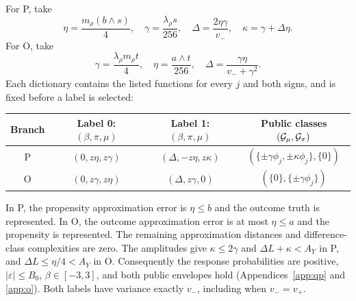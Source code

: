 \documentclass{article}
\theoremstyle{definition}
\theoremstyle{remark}
\begin{document}
For P, take
\[
 \eta=\frac{m_\rho(b\wedge s)}4,\quad
 \gamma=\frac{\lambda_\rho s}{256},\quad
 \Delta=\frac{2\eta\gamma}{v_-},\quad \kappa=\gamma+\Delta\eta.
\]
For O, take
\[
 \gamma=\frac{\lambda_\rho m_\rho t}4,\quad
 \eta=\frac{a\wedge t}{256},\quad
 \Delta=\frac{\gamma\eta}{v_-+\gamma^2}.
\]
Each dictionary contains the listed functions for every \(j\) and both signs, and is fixed before a label is selected:
\begin{center}
\begin{tabular}{c c c c}
\toprule
Branch & Label 0: \((\beta,\pi,\mu)\) & Label 1: \((\beta,\pi,\mu)\) & Public classes \((\mathcal G_\mu,\mathcal G_\pi)\)\\
\midrule
P & \((0,z\eta,z\gamma)\) & \((\Delta,-z\eta,z\kappa)\) & \((\{\pm\gamma\phi_j,\pm\kappa\phi_j\},\{0\})\)\\
O & \((0,z\gamma,z\eta)\) & \((\Delta,z\gamma,0)\) & \((\{0\},\{\pm\gamma\phi_j\})\)\\
\bottomrule
\end{tabular}
\end{center}
In P, the propensity approximation error is \(\eta\le b\) and the outcome truth is represented. In O, the outcome approximation error is at most \(\eta\le a\) and the propensity is represented. The remaining approximation distances and difference-class complexities are zero. The amplitudes give \(\kappa\le2\gamma\) and \(\Delta L+\kappa<A_Y\) in P, and \(\Delta L\le\eta/4<A_Y\) in O. Consequently the response probabilities are positive, \(|\varepsilon|\le B_0\), \(\beta\in[-3,3]\), and both public envelopes hold (Appendices~\ref{app:qp} and \ref{app:o}). Both labels have variance exactly \(v_-\), including when \(v_-=v_+\).
\end{document}
